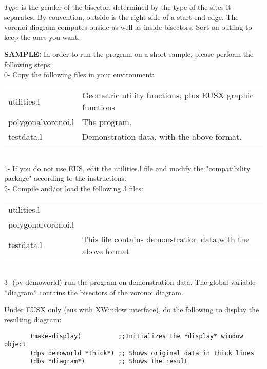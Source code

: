 \begin{refdesc}
$Type$ is the gender of the bisector, determined by the type of the sites
it separates.
By convention, outside is the right side of a start-end edge.
The voronoi diagram computes ouside as well as inside bisectors.
Sort on outflag to keep the ones you want.


{\bf SAMPLE:}
In order to run the program on a short  sample, 
please perform the following steps:
\\
0- Copy the following files in your environment:
\\
\begin{tabular}{ll}
utilities.l & Geometric utility functions, plus EUSX graphic functions\\
polygonalvoronoi.l & The program.\\
testdata.l & Demonstration data, with the above format.  
\end{tabular}
\\
1- If you do not use EUS, edit the utilities.l file and
modify the "compatibility package" according to the instructions.
\\
2- Compile and/or load the following 3 files:
\\
\begin{tabular}{ll}
utilities.l\\
polygonalvoronoi.l\\
testdata.l & This file contains demonstration data,with the above format
\end{tabular}
\\
3- (pv demoworld)  run the program on demonstration data. 
The global variable *diagram* contains the bisectors of the voronoi diagram.

Under EUSX only (eus with XWindow interface), do the following
to display the resulting diagram:
\begin{verbatim}
       (make-display)          ;;Initializes the *display* window object
       (dps demoworld *thick*) ;; Shows original data in thick lines
       (dbs *diagram*)         ;; Shows the result
\end{verbatim}

\end{refdesc}

\newpage